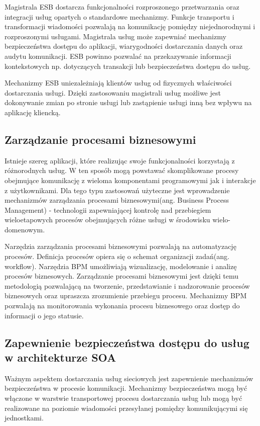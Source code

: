		Magistrala ESB dostarcza funkcjonalności rozproszonego przetwarzania oraz integracji usług opartych o standardowe mechanizmy. Funkcje transportu i transformacji wiadomości pozwalają na komunikację pomiędzy niejednorodnymi i rozproszonymi usługami. Magistrala usług może zapewniać mechanizmy bezpieczeństwa dostępu do aplikacji, wiarygodności dostarczania danych oraz audytu komunikacji. ESB powinno pozwalać na przekazywanie informacji kontekstowych np. dotyczących transakcji lub bezpieczeństwa dostępu do usług.

		Mechanizmy ESB uniezależniają klientów usług od fizycznych właściwości dostarczania usługi. Dzięki zastosowaniu magistrali usług możliwe jest dokonywanie zmian po stronie usługi lub zastąpienie usługi inną bez wpływu na aplikację kliencką. 

	\subsection{Zarządzanie procesami biznesowymi} 

		Istnieje szereg aplikacji, które realizując swoje funkcjonalności korzystają z różnorodnych usług. W ten sposób mogą powstawać skomplikowane procesy obejmujące komunikację z wieloma komponentami programowymi jak i interakcje z użytkownikami. Dla tego typu zastosowań użyteczne jest wprowadzenie mechanizmów zarządzania procesami biznesowymi(ang. Business Process Management) - technologii zapewniającej kontrolę nad przebiegiem wieloetapowych procesów obejmujących różne usługi w środowisku wielo-domenowym.

		Narzędzia zarządzania procesami biznesowymi pozwalają na automatyzację procesów. Definicja procesów opiera się o schemat organizacji zadań(ang. workflow). Narzędzia BPM umożliwiają wizualizację, modelowanie i analizę procesów biznesowych. Zarządzanie procesami biznesowymi jest dzięki temu metodologią pozwalającą na tworzenie, przedstawianie i nadzorowanie procesów biznesowych oraz upraszcza zrozumienie przebiegu procesu. Mechanizmy BPM pozwalają na monitorowania wykonania procesu biznesowego oraz dostęp do informacji o jego statusie. 

	\subsection{Zapewnienie bezpieczeństwa dostępu do usług w architekturze SOA}

		Ważnym aspektem dostarczania usług sieciowych jest zapewnienie mechanizmów bezpieczeństwa w procesie komunikacji. Mechanizmy bezpieczeństwa mogą być włączone w warstwie transportowej procesu dostarczania usług lub mogą być realizowane na poziomie wiadomości przesyłanej pomiędzy komunikującymi się jednostkami\cite{Szychowiak09}. 

